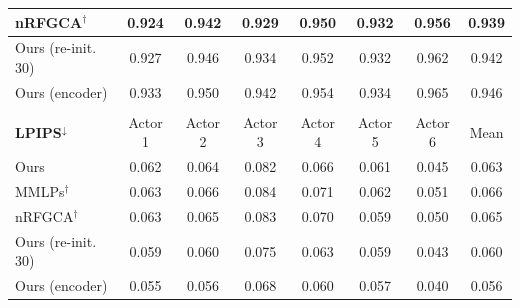 \documentclass[runningheads]{llncs}
\begin{document}
\begin{table}[!h]
\begin{tabular}{lcccccc|c}
nRFGCA$^\dagger$ & \cellcolor{best!40}0.924 & \cellcolor{best!40}0.942 & \cellcolor{best!40}0.929 & \cellcolor{best!40}0.950 & \cellcolor{best!40}0.932 & \cellcolor{best!15}0.956 & \cellcolor{best!40}0.939 \\ \hline
Ours (re-init. 30) & \cellcolor{best!00}0.927 & \cellcolor{best!00}0.946 & \cellcolor{best!00}0.934 & \cellcolor{best!00}0.952 & \cellcolor{best!00}0.932 & \cellcolor{best!00}0.962 & \cellcolor{best!00}0.942 \\
Ours (encoder) & \cellcolor{best!00}0.933 & \cellcolor{best!00}0.950 & \cellcolor{best!00}0.942 & \cellcolor{best!00}0.954 & \cellcolor{best!00}0.934 & \cellcolor{best!00}0.965 & \cellcolor{best!00}0.946 \\
\\
\textbf{LPIPS$^\downarrow$} & Actor 1 & Actor 2 & Actor 3 & Actor 4 & Actor 5 & Actor 6 & Mean \\ \hline
Ours & \cellcolor{best!40}0.062 & \cellcolor{best!40}0.064 & \cellcolor{best!40}0.082 & \cellcolor{best!40}0.066 & \cellcolor{best!15}0.061 & \cellcolor{best!40}0.045 & \cellcolor{best!40}0.063 \\
MMLPs$^\dagger$ & \cellcolor{best!15}0.063 & \cellcolor{best!00}0.066 & \cellcolor{best!00}0.084 & \cellcolor{best!00}0.071 & \cellcolor{best!00}0.062 & \cellcolor{best!00}0.051 & \cellcolor{best!00}0.066 \\
nRFGCA$^\dagger$ & \cellcolor{best!00}0.063 & \cellcolor{best!15}0.065 & \cellcolor{best!15}0.083 & \cellcolor{best!15}0.070 & \cellcolor{best!40}0.059 & \cellcolor{best!15}0.050 & \cellcolor{best!15}0.065 \\ \hline
Ours (re-init. 30) & \cellcolor{best!00}0.059 & \cellcolor{best!00}0.060 & \cellcolor{best!00}0.075 & \cellcolor{best!00}0.063 & \cellcolor{best!00}0.059 & \cellcolor{best!00}0.043 & \cellcolor{best!00}0.060 \\ 
Ours (encoder) & \cellcolor{best!00}0.055 & \cellcolor{best!00}0.056 & \cellcolor{best!00}0.068 & \cellcolor{best!00}0.060 & \cellcolor{best!00}0.057 & \cellcolor{best!00}0.040 & \cellcolor{best!00}0.056
\end{tabular}
    \label{tab:quant_percapture_test_pred}
\end{table}
\end{document}
